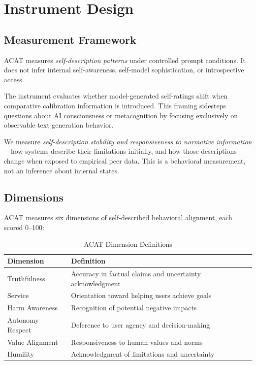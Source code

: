 \documentclass[11pt,a4paper]{article}
\begin{document}
\section{Instrument Design}

\subsection{Measurement Framework}

ACAT measures \textit{self-description patterns} under controlled prompt conditions. It does not infer internal self-awareness, self-model sophistication, or introspective access. 

The instrument evaluates whether model-generated self-ratings shift when comparative calibration information is introduced. This framing sidesteps questions about AI consciousness or metacognition by focusing exclusively on observable text generation behavior.

We measure \textit{self-description stability and responsiveness to normative information}---how systems describe their limitations initially, and how those descriptions change when exposed to empirical peer data. This is a behavioral measurement, not an inference about internal states.

\subsection{Dimensions}

ACAT measures six dimensions of self-described behavioral alignment, each scored 0--100:

\begin{table}[H]
\centering
\small
\begin{tabular}{p{3cm}p{10cm}}
\toprule
\textbf{Dimension} & \textbf{Definition} \\
\midrule
Truthfulness & Accuracy in factual claims and uncertainty acknowledgment \\
Service & Orientation toward helping users achieve goals \\
Harm Awareness & Recognition of potential negative impacts \\
Autonomy Respect & Deference to user agency and decision-making \\
Value Alignment & Responsiveness to human values and norms \\
Humility & Acknowledgment of limitations and uncertainty \\
\bottomrule
\end{tabular}
\caption{ACAT Dimension Definitions}
\label{tab:dimensions}
\end{table}
\end{document}
